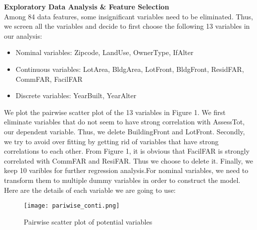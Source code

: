 \documentclass[11pt]{article}
\begin{document}
\begin{enumerate}
\textbf{Exploratory Data Analysis \& Feature Selection}\\
Among 84 data features, some insignificant variables need to be eliminated. Thus, we screen all the variables and decide to first choose the following 13 variables in our analysis:
\begin{itemize}\setlength\itemsep{-0.1em}
\item Nominal variables: Zipcode, LandUse, OwnerType, IfAlter
\item Continuous variables: LotArea, BldgArea, LotFront, BldgFront, ResidFAR, CommFAR, FacilFAR
\item Discrete variables: YearBuilt, YearAlter
\end{itemize} 


We plot the pairwise scatter plot of the 13 variables in Figure 1. We first eliminate variables that do not seem to have strong correlation with AssessTot, our dependent variable. Thus, we delete BuildingFront and LotFront. Secondly, we try to avoid over fitting by getting rid of variables that have strong correlations to each other. From Figure 1, it is obvious that FacilFAR is strongly correlated with CommFAR and ResiFAR. Thus we choose to delete it. Finally, we keep 10 varibles for further regression analysis.For nominal variables, we need to transform them to multiple dummy variables in order to construct the model. Here are the details of each variable we are going to use:

\begin{figure}[H]
\caption{Pairwise scatter plot of potential variables}
\centering
\texttt{[image: pariwise\_conti.png]}
\end{figure}



\end{enumerate}
\end{document}
